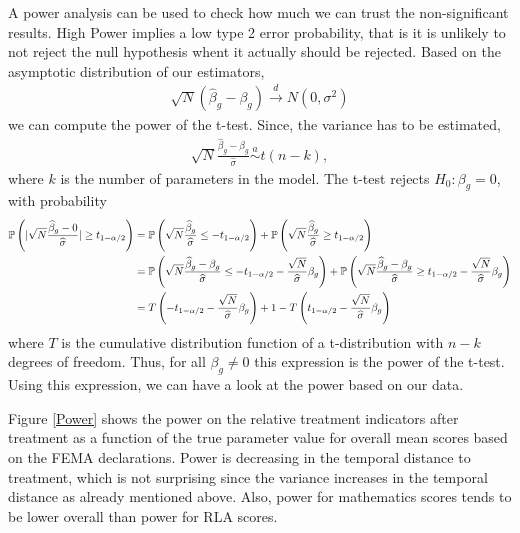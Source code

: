 A power analysis can be used to check how much we can trust the non-significant results. High Power implies a low type 2 error probability, that is it is unlikely to not reject the null hypothesis whent it actually should be rejected. Based on the asymptotic distribution of our estimators,
\begin{align*}
	\sqrt{N} (\widehat{\beta}_{g} - \beta_{g}) \overset{d}{\to} N(0, \sigma^2)
\end{align*}
we can compute the power of the t-test. Since, the variance has to be estimated, 
\begin{align*}
	\sqrt{N} \frac{\widehat{\beta}_{g} - \beta_{g}}{\widehat{\sigma}} \overset{a}{\sim} t(n-k),
\end{align*}
where $k$ is the number of parameters in the model. The t-test rejects $H_0: \beta_g = 0$, with probability
\begin{align*}
	\mathbb{P} \left( \lvert \sqrt{N} \frac{\widehat{\beta}_{g} - 0}{\widehat{\sigma}} \rvert \geq t_{1-\alpha/2}  \right) &= \mathbb{P} \left(  \sqrt{N} \frac{\widehat{\beta}_{g}}{\widehat{\sigma}}  \leq -t_{1-\alpha/2}  \right) + \mathbb{P} \left( \sqrt{N} \frac{\widehat{\beta}_{g}}{\widehat{\sigma}} \geq t_{1-\alpha/2}  \right) \\
	&= \mathbb{P} \left(  \sqrt{N} \frac{\widehat{\beta}_{g} - \beta_g}{\widehat{\sigma}}  \leq -t_{1-\alpha/2} - \frac{\sqrt{N}}{\widehat{\sigma}} \beta_{g}  \right) + \mathbb{P} \left( \sqrt{N} \frac{\widehat{\beta}_{g} - \beta_g}{\widehat{\sigma}} \geq t_{1-\alpha/2}  - \frac{\sqrt{N}}{\widehat{\sigma}} \beta_{g} \right) \\
	&= T\left( -t_{1-\alpha/2} - \frac{\sqrt{N}}{\widehat{\sigma}} \beta_{g} \right) + 1 - T \left(  t_{1-\alpha/2}  - \frac{\sqrt{N}}{\widehat{\sigma}} \beta_{g} \right)
\end{align*}
where $T$ is the cumulative distribution function of a t-distribution with $n-k$ degrees of freedom. Thus, for all $\beta_g \neq 0$ this expression is the power of the t-test. Using this expression, we can have a look at the power based on our data.

Figure \ref{Power} shows the power on the relative treatment indicators after treatment as a function of the true parameter value for overall mean scores based on the FEMA declarations. Power is decreasing in the temporal distance to treatment, which is not surprising since the variance increases in the temporal distance as already mentioned above. Also, power for mathematics scores tends to be lower overall than power for RLA scores. 


